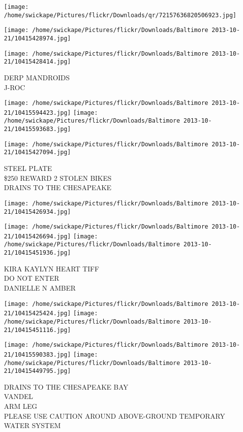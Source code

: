 \documentclass[10pt,letterpaper]{article}
\begin{document}
\texttt{[image: /home/swickape/Pictures/flickr/Downloads/qr/72157636820506923.jpg]}
\pagebreak

\texttt{[image: /home/swickape/Pictures/flickr/Downloads/Baltimore 2013-10-21/10415428974.jpg]}

\vspace{0.25in}
\texttt{[image: /home/swickape/Pictures/flickr/Downloads/Baltimore 2013-10-21/10415428414.jpg]}

DERP MANDROIDS\\
J{-}ROC
\pagebreak

\texttt{[image: /home/swickape/Pictures/flickr/Downloads/Baltimore 2013-10-21/10415594423.jpg]}
\texttt{[image: /home/swickape/Pictures/flickr/Downloads/Baltimore 2013-10-21/10415593683.jpg]}

\vspace{0.25in}
\texttt{[image: /home/swickape/Pictures/flickr/Downloads/Baltimore 2013-10-21/10415427094.jpg]}

STEEL PLATE\\
\$250 REWARD 2 STOLEN BIKES\\
DRAINS TO THE CHESAPEAKE
\pagebreak

\texttt{[image: /home/swickape/Pictures/flickr/Downloads/Baltimore 2013-10-21/10415426934.jpg]}

\vspace{0.25in}
\texttt{[image: /home/swickape/Pictures/flickr/Downloads/Baltimore 2013-10-21/10415426694.jpg]}
\texttt{[image: /home/swickape/Pictures/flickr/Downloads/Baltimore 2013-10-21/10415451936.jpg]}

KIRA KAYLYN HEART TIFF\\
DO NOT ENTER\\
DANIELLE N AMBER
\pagebreak

\texttt{[image: /home/swickape/Pictures/flickr/Downloads/Baltimore 2013-10-21/10415425424.jpg]}
\texttt{[image: /home/swickape/Pictures/flickr/Downloads/Baltimore 2013-10-21/10415451116.jpg]}

\texttt{[image: /home/swickape/Pictures/flickr/Downloads/Baltimore 2013-10-21/10415590383.jpg]}
\texttt{[image: /home/swickape/Pictures/flickr/Downloads/Baltimore 2013-10-21/10415449795.jpg]}

DRAINS TO THE CHESAPEAKE BAY\\
VANDEL\\
ARM LEG\\
PLEASE USE CAUTION AROUND ABOVE{-}GROUND TEMPORARY WATER SYSTEM
\pagebreak
\end{document}
